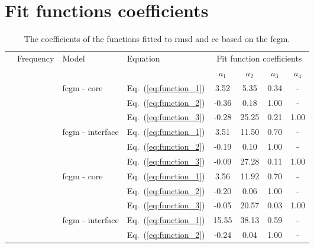 \chapter{Fit functions coefficients}
\label{app:fit_functions}

\begin{table}
	\small
	\tabcolsep=0.2cm
	\centering
	\caption{\label{tab:fit_fcgm_coeff}The coefficients of the functions fitted to \acf{rmsd}  and \acf{cc} based on the \acf{fcgm}.}
	\begin{tabular}{ccllcccc}
		\toprule
		\multirow{2}{*}{\rotatebox[origin=c]{90}{Index}}& \multirow{2}{*}{Frequency} & \multirow{2}{*}{Model} & Equation & \multicolumn{4}{c}{Fit function coefficients}\\
		& & & & \(a_1\) & \(a_2\) & \(a_3\) & \(a_4\)\\
		\midrule
		\multirow{12}{*}{\rotatebox[origin=c]{90}{\ac{rmsd}}} & \multirow{6}{*}{\rotatebox[origin=c]{90}{50 \unit{\kHz}}} & \multirow{3}{*}{\ac{fcgm} - core} & Eq.~(\ref{eq:function_1}) & 3.52 & 5.35 & 0.34 &-\\
		& & & Eq.~(\ref{eq:function_2}) & -0.36 & 0.18 & 1.00 & -\\
		& & & Eq.~(\ref{eq:function_3}) & -0.28 & 25.25 & 0.21 & 1.00 \\
		\cline{3-8}
		& & \multirow{3}{*}{\ac{fcgm} - interface} & Eq.~(\ref{eq:function_1}) & 3.51 & 11.50 & 0.70 &-\\
		& & & Eq.~(\ref{eq:function_2}) & -0.19 & 0.10 & 1.00 &- \\
		& & & Eq.~(\ref{eq:function_3}) & -0.09 & 27.28 & 0.11 & 1.00 \\
		\cline{2-8}
		& \multirow{6}{*}{\rotatebox[origin=c]{90}{100 \unit{\kHz}}} & \multirow{3}{*}{\ac{fcgm} - core} & Eq.~(\ref{eq:function_1}) & 3.56 & 11.92 & 0.70 &-\\
		& & & Eq.~(\ref{eq:function_2}) & -0.20 & 0.06 & 1.00 &- \\
		& & & Eq.~(\ref{eq:function_3}) & -0.05 & 20.57 & 0.03 & 1.00 \\
		\cline{3-8}
		& & \multirow{3}{*}{\ac{fcgm} - interface} & Eq.~(\ref{eq:function_1}) & 15.55 & 38.13 & 0.59 &- \\
		& & & Eq.~(\ref{eq:function_2}) & -0.24 & 0.04 & 1.00 & -\\

\end{tabular}
\end{table}
